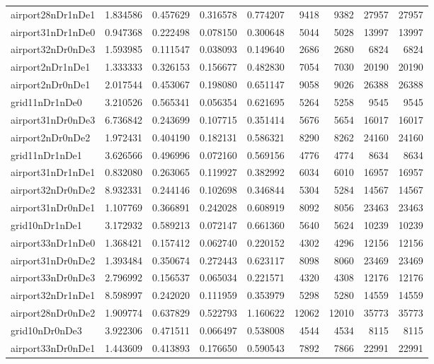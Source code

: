 \begin{longtable}{|l|r|r|r|r|r|r|r|r|}
airport28nDr1nDe1 & 1.834586 & 0.457629 & 0.316578 & 0.774207 & 9418 & 9382 & 27957 & 27957 \\
airport31nDr1nDe0 & 0.947368 & 0.222498 & 0.078150 & 0.300648 & 5044 & 5028 & 13997 & 13997 \\
airport32nDr0nDe3 & 1.593985 & 0.111547 & 0.038093 & 0.149640 & 2686 & 2680 & 6824 & 6824 \\
airport2nDr1nDe1 & 1.333333 & 0.326153 & 0.156677 & 0.482830 & 7054 & 7030 & 20190 & 20190 \\
airport2nDr0nDe1 & 2.017544 & 0.453067 & 0.198080 & 0.651147 & 9058 & 9026 & 26388 & 26388 \\
grid11nDr1nDe0 & 3.210526 & 0.565341 & 0.056354 & 0.621695 & 5264 & 5258 & 9545 & 9545 \\
airport31nDr0nDe3 & 6.736842 & 0.243699 & 0.107715 & 0.351414 & 5676 & 5654 & 16017 & 16017 \\
airport2nDr0nDe2 & 1.972431 & 0.404190 & 0.182131 & 0.586321 & 8290 & 8262 & 24160 & 24160 \\
grid11nDr1nDe1 & 3.626566 & 0.496996 & 0.072160 & 0.569156 & 4776 & 4774 & 8634 & 8634 \\
airport31nDr1nDe1 & 0.832080 & 0.263065 & 0.119927 & 0.382992 & 6034 & 6010 & 16957 & 16957 \\
airport32nDr0nDe2 & 8.932331 & 0.244146 & 0.102698 & 0.346844 & 5304 & 5284 & 14567 & 14567 \\
airport31nDr0nDe1 & 1.107769 & 0.366891 & 0.242028 & 0.608919 & 8092 & 8056 & 23463 & 23463 \\
grid10nDr1nDe1 & 3.172932 & 0.589213 & 0.072147 & 0.661360 & 5640 & 5624 & 10239 & 10239 \\
airport33nDr1nDe0 & 1.368421 & 0.157412 & 0.062740 & 0.220152 & 4302 & 4296 & 12156 & 12156 \\
airport31nDr0nDe2 & 1.393484 & 0.350674 & 0.272443 & 0.623117 & 8098 & 8060 & 23469 & 23469 \\
airport33nDr0nDe3 & 2.796992 & 0.156537 & 0.065034 & 0.221571 & 4320 & 4308 & 12176 & 12176 \\
airport32nDr1nDe1 & 8.598997 & 0.242020 & 0.111959 & 0.353979 & 5298 & 5280 & 14559 & 14559 \\
airport28nDr0nDe2 & 1.909774 & 0.637829 & 0.522793 & 1.160622 & 12062 & 12010 & 35773 & 35773 \\
grid10nDr0nDe3 & 3.922306 & 0.471511 & 0.066497 & 0.538008 & 4544 & 4534 & 8115 & 8115 \\
airport33nDr0nDe1 & 1.443609 & 0.413893 & 0.176650 & 0.590543 & 7892 & 7866 & 22991 & 22991 \\

\end{longtable}
